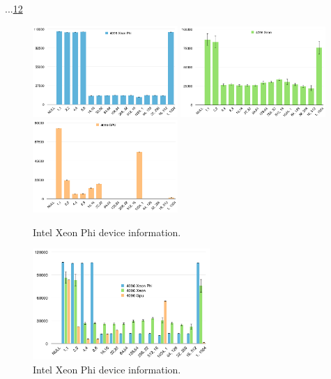 \par{...\ref{Naive}\ref{NaiveComp}}

\begin{figure}[!h]
    \centering
    \includegraphics[width=0.49\textwidth]{figures/naive_phi.png}
    \includegraphics[width=0.49\textwidth]{figures/naive_cpu.png}
    \includegraphics[width=0.49\textwidth]{figures/naive_gpu.png}
    \caption{Intel Xeon Phi device information.}
    \label{Naive}
\end{figure}

\begin{figure}[!h]
    \centering
    \includegraphics[width=0.6\textwidth]{figures/naive_comp.png}
    \caption{Intel Xeon Phi device information.}
    \label{NaiveComp}
\end{figure}

